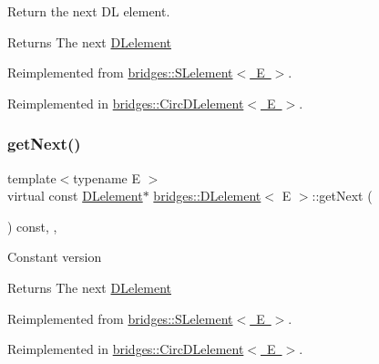 Return the next DL element.

\begin{DoxyReturn}{Returns}
The next \mbox{\hyperlink{classbridges_1_1_d_lelement}{D\+Lelement}} 
\end{DoxyReturn}


Reimplemented from \mbox{\hyperlink{classbridges_1_1_s_lelement_a5bd74108a9aa49339378bf62cdbb19ca}{bridges\+::\+S\+Lelement$<$ E $>$}}.



Reimplemented in \mbox{\hyperlink{classbridges_1_1_circ_d_lelement_a52996d42efc5680d1f8b406143abfee5}{bridges\+::\+Circ\+D\+Lelement$<$ E $>$}}.

\mbox{\label{classbridges_1_1_d_lelement_a648012849263b4b1cd2d504d5e5fd880}} 
\subsubsection{\texorpdfstring{get\+Next()}{getNext()}\hspace{0.1cm}{\footnotesize\ttfamily [2/2]}}
{\footnotesize\ttfamily template$<$typename E $>$ \\
virtual const \mbox{\hyperlink{classbridges_1_1_d_lelement}{D\+Lelement}}$\ast$ \mbox{\hyperlink{classbridges_1_1_d_lelement}{bridges\+::\+D\+Lelement}}$<$ E $>$\+::get\+Next (\begin{DoxyParamCaption}{ }\end{DoxyParamCaption}) const\hspace{0.3cm}{\ttfamily [inline]}, {\ttfamily [override]}, {\ttfamily [virtual]}}

Constant version

\begin{DoxyReturn}{Returns}
The next \mbox{\hyperlink{classbridges_1_1_d_lelement}{D\+Lelement}} 
\end{DoxyReturn}


Reimplemented from \mbox{\hyperlink{classbridges_1_1_s_lelement_a4422b7731a84734d312b8cd8e241b1e8}{bridges\+::\+S\+Lelement$<$ E $>$}}.



Reimplemented in \mbox{\hyperlink{classbridges_1_1_circ_d_lelement_ac266d60bd2f7ce92cb38a12875a6a468}{bridges\+::\+Circ\+D\+Lelement$<$ E $>$}}.

\mbox{\label{classbridges_1_1_d_lelement_a5b0316fb255d022b0dc3065d681fc2a7}} 
